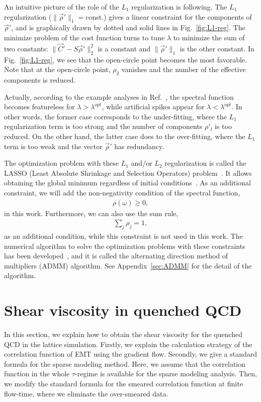 \documentclass[a4paper,11pt]{article}
\newcommand\beq{ \begin{eqnarray} }
\newcommand\eeq{ \end{eqnarray} }
\begin{document}
An intuitive picture of the role of the $L_1$ regularization is following.
The $L_1$ regularization ($\| \vec{\rho}' \|_1 = $const.) gives a linear constraint for the components of $\vec{\rho}'$, and is graphically drawn by dotted and solid lines in Fig.~\ref{fig:L1-reg}. 
The minimize problem of the cost function turns  to tune $\lambda$ to minimize the sum of two constants: $\|  \vec{C}' - S \vec{\rho}'    \|_2^2 $ is a constant and $\| \vec{\rho}' \|_1  $ is the other constant.
In Fig.~\ref{fig:L1-reg}, we see that the open-circle point becomes the most favorable.
Note that at the open-circle point, $\rho_2$ vanishes and the number of the effective components is reduced.

Actually, according to the example analyses in Ref.~\cite{Shinaoka2017b, review-sparse}, the spectral function becomes featureless for $\lambda > \lambda^{opt}$, while artificial spikes appear for $\lambda < \lambda^{opt}$.
In other words, the former case corresponds to the under-fitting, where the $L_1$ regularization term is too strong and the number of components  $\rho'_l$ is too reduced.
On the other hand, the latter case does to the over-fitting, where the $L_1$ term is too weak and the vector $\vec{\rho}'$ has redundancy.




The optimization problem with these $L_1$ and/or $L_2$ regularization is called  the LASSO (Least Absolute Shrinkage and Selection Operators) problem~\cite{LASSO}.
It allows obtaining the global minimum regardless of initial conditions~\cite{ADMM1, ADMM2}.
As an additional constraint, we will add the non-negativity condition of the spectral function,
\beq
\rho(\omega) \ge 0,
\eeq 
in this work.
Furthermore, we can also use the sum rule,
\beq
\sum_j \rho_j=1,
\eeq
as an additional condition, while this constraint is not  used in this work.
The numerical algorithm to solve the optimization problems with these constraints has been developed~\cite{ADMM1, ADMM2}, and it is called the alternating direction method of multipliers (ADMM) algorithm.
See Appendix~\ref{sec:ADMM} for the detail  of the algorithm.





\section{Shear viscosity in quenched QCD}\label{sec:shear-viscosity}
In this section, we explain how to obtain the shear viscosity for the quenched QCD in the lattice simulation. 
Firstly, we explain the calculation strategy of the correlation function of EMT using the gradient flow.
Secondly, we give a standard formula for the sparse modeling method. 
Here, we assume that the correlation function in the whole $\tau$-regime is available for the sparse modeling analysis.
Then, we modify the standard formula for the smeared correlation function at  finite flow-time, where we eliminate the over-smeared data.
\end{document}
